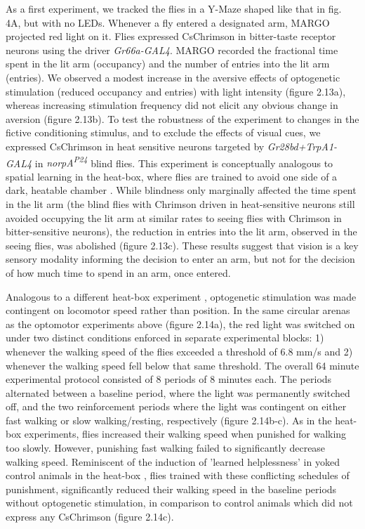 \documentclass[12pt,letterpaper]{article}
\begin{document}
As a first experiment, we tracked the flies in a Y-Maze shaped like that in fig. 4A, but with no LEDs. Whenever a fly entered a designated arm, MARGO projected red light on it. Flies expressed CsChrimson in bitter-taste receptor neurons using the driver \textit{Gr66a-GAL4}. MARGO recorded the fractional time spent in the lit arm (occupancy) and the number of entries into the lit arm (entries). We observed a modest increase in the aversive effects of optogenetic stimulation (reduced occupancy and entries) with light intensity (figure 2.13a), whereas increasing stimulation frequency did not elicit any obvious change in aversion (figure 2.13b). To test the robustness of the experiment to changes in the fictive conditioning stimulus, and to exclude the effects of visual cues, we expressed CsChrimson in heat sensitive neurons targeted by \textit{Gr28bd+TrpA1-GAL4} in \textit{norpA\textsuperscript{P24}} blind flies. This experiment is conceptually analogous to spatial learning in the heat-box, where flies are trained to avoid one side of a dark, heatable chamber \cite{wustmann_rein_wolf_heisenberg_1996,wustmann_heisenberg_1997,diegelmann_2006,ostrowski_kahsai_kramer_knutson_zars_2015,putz_2002,sitaraman_zars_zars_2007,sitaraman_zars_zars_2010,zars_zars_2006}. While blindness only marginally affected the time spent in the lit arm (the blind flies with Chrimson driven in heat-sensitive neurons still avoided occupying the lit arm at similar rates to seeing flies with Chrimson in bitter-sensitive neurons), the reduction in entries into the lit arm, observed in the seeing flies, was abolished (figure 2.13c). These results suggest that vision is a key sensory modality informing the decision to enter an arm, but not for the decision of how much time to spend in an arm, once entered.

Analogous to a different heat-box experiment \cite{YANG2013799}, optogenetic stimulation was made contingent on locomotor speed rather than position. In the same circular arenas as the optomotor experiments above (figure 2.14a), the red light was switched on under two distinct conditions enforced in separate experimental blocks: 1) whenever the walking speed of the flies exceeded a threshold of 6.8 mm/s and 2) whenever the walking speed fell below that same threshold. The overall 64 minute experimental protocol consisted of 8 periods of 8 minutes each. The periods alternated between a baseline period, where the light was permanently switched off, and the two reinforcement periods where the light was contingent on either fast walking or slow walking/resting, respectively (figure 2.14b-c). As in the heat-box experiments, flies increased their walking speed when punished for walking too slowly. However, punishing fast walking failed to significantly decrease walking speed. Reminiscent of the induction of 'learned helplessness' in yoked control animals in the heat-box \cite{YANG2013799}, flies trained with these conflicting schedules of punishment, significantly reduced their walking speed in the baseline periods without optogenetic stimulation, in comparison to control animals which did not express any CsChrimson (figure 2.14c).
\end{document}
